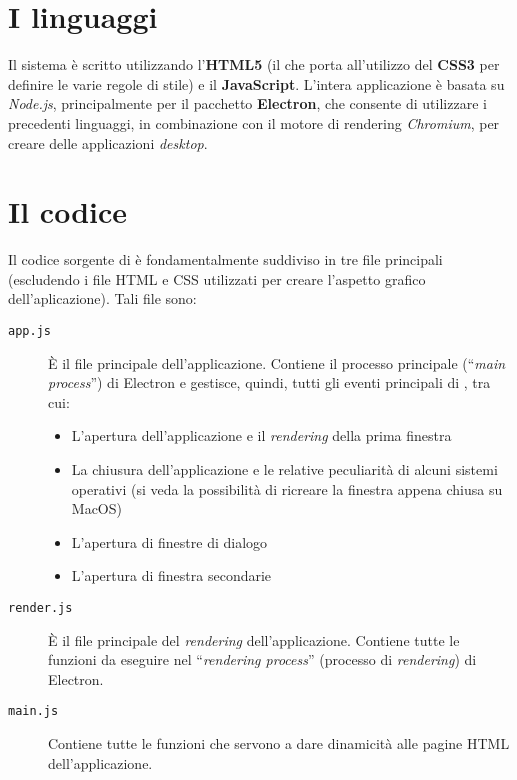 \section{I linguaggi}
Il sistema \ProjectTitle{} è scritto utilizzando l'\textbf{HTML5} (il che porta all'utilizzo del \textbf{CSS3} per definire le varie regole di stile) e il \textbf{JavaScript}. L'intera applicazione è basata su \emph{Node.js}, principalmente per il pacchetto \textbf{Electron}, che consente di utilizzare i precedenti linguaggi, in combinazione con il motore di rendering \emph{Chromium}, per creare delle applicazioni \textit{desktop}.

\section{Il codice}
Il codice sorgente di \ProjectTitle{} è fondamentalmente suddiviso in tre file principali (escludendo i file HTML e CSS utilizzati per creare l'aspetto grafico dell'aplicazione). Tali file sono:
\begin{description}
	\item[\texttt{app.js}] È il file principale dell'applicazione. Contiene il processo principale (``\emph{main process}'') di Electron e gestisce, quindi, tutti gli eventi principali di \ProjectTitle{}, tra cui:
	\begin{itemize}
		\item L'apertura dell'applicazione e il \emph{rendering} della prima finestra
		\item La chiusura dell'applicazione e le relative peculiarità di alcuni sistemi operativi (si veda la possibilità di ricreare la finestra appena chiusa su MacOS)
		\item L'apertura di finestre di dialogo
		\item L'apertura di finestra secondarie
	\end{itemize} 
	\item[\texttt{render.js}] È il file principale del \emph{rendering} dell'applicazione. Contiene tutte le funzioni da eseguire nel ``\emph{rendering process}'' (processo di \emph{rendering}) di Electron.
	\item[\texttt{main.js}] Contiene tutte le funzioni che servono a dare dinamicità alle pagine HTML dell'applicazione. 
\end{description}
